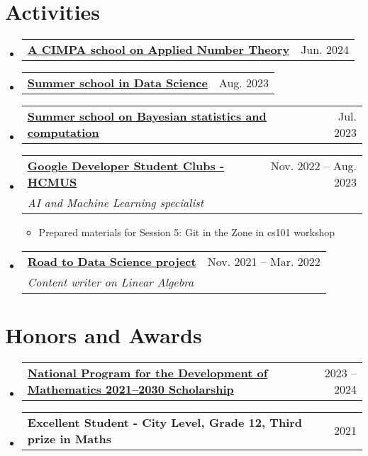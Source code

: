 \documentclass[letterpaper,11pt]{article}
\makeatletter
\newcommand{\heading}[4]{
    \normalsize
    \begin{tabular*}{0.97\textwidth}[t]{l@{\extracolsep{\fill}}r}
      \textbf{#1} & #2 \\[-2pt]
      \textit{\small#3} & \textit{\small #4}
    \end{tabular*}
    \vspace{-2pt}
}
\newcommand{\subheading}[2]{
    \normalsize
    \begin{tabular*}{0.97\textwidth}[t]{l@{\extracolsep{\fill}}r}
      \textbf{#1} & #2 \\
    \end{tabular*}
    \vspace{-2pt}
}
\makeatother
\begin{document}
\section{Activities}
    \begin{itemize}
        
        \item \subheading{\href{http://www.rnta.eu/HCMC2024/index.html}{A CIMPA school on Applied Number Theory \faExternalLink}}{Jun. 2024}
        
        
        \item \subheading{\href{https://viasm.edu.vn/hdkh/ssds2023}{Summer school in Data Science \faExternalLink}}{Aug. 2023}
        
        \item \subheading{\href{https://viasm.edu.vn/hdkh/somsaml}{Summer school on Bayesian statistics and computation \faExternalLink}}{Jul. 2023}

        \item \heading{\href{https://www.facebook.com/gdgoc.hcmus}{Google Developer Student Clubs - HCMUS \faExternalLink}}{Nov. 2022 -- Aug. 2023}{AI and Machine Learning specialist}{}
            \begin{itemize}
                \item Prepared materials for Session 5: Git in the Zone in cs101 workshop
            \end{itemize}
        
        \item \heading{\href{https://www.facebook.com/RDSproject/}{Road to Data Science project \faExternalLink}}{Nov. 2021 -- Mar. 2022}{Content writer on Linear Algebra}{}
    \end{itemize}


\section{Honors and Awards}
    \begin{itemize}
        \item \subheading{\href{https://viasm.edu.vn/hoat-dong-khoa-hoc/tin-tuc/chi-tiet/hoc-bong-chuong-trinh-toan-nam-hoc-2023-2024}{\small National Program for the Development of Mathematics  2021--2030 Scholarship \faExternalLink}}{2023 -- 2024}
        
        \item \subheading{\small Excellent Student - City Level, Grade 12, Third prize in Maths}{2021}
    \end{itemize}
\end{document}
